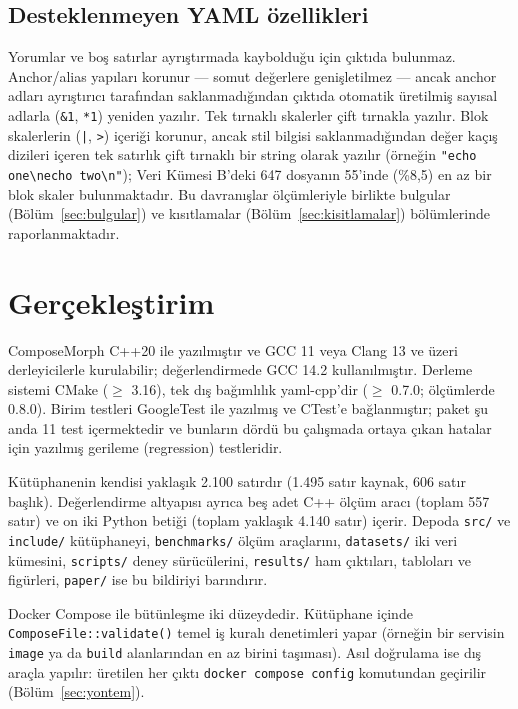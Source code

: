 \documentclass[conference]{IEEEtran}
\begin{document}
\subsection{Desteklenmeyen YAML özellikleri}
Yorumlar ve boş satırlar ayrıştırmada kaybolduğu için çıktıda bulunmaz.
Anchor/alias yapıları korunur --- somut değerlere genişletilmez --- ancak
anchor adları ayrıştırıcı tarafından saklanmadığından çıktıda otomatik
üretilmiş sayısal adlarla (\texttt{\&1}, \texttt{*1}) yeniden yazılır.
Tek tırnaklı skalerler çift tırnakla yazılır. Blok skalerlerin
(\texttt{|}, \texttt{>}) içeriği korunur, ancak stil bilgisi
saklanmadığından değer kaçış dizileri içeren tek satırlık çift tırnaklı bir
string olarak yazılır (örneğin \texttt{"echo one\textbackslash necho two\textbackslash n"});
Veri Kümesi B'deki 647 dosyanın 55'inde (\%8,5) en az bir blok skaler
bulunmaktadır. Bu davranışlar ölçümleriyle birlikte bulgular
(Bölüm~\ref{sec:bulgular}) ve kısıtlamalar (Bölüm~\ref{sec:kisitlamalar})
bölümlerinde raporlanmaktadır.

\section{Gerçekleştirim}
\label{sec:gerceklestirim}

ComposeMorph C++20 ile yazılmıştır ve GCC 11 veya Clang 13 ve üzeri
derleyicilerle kurulabilir; değerlendirmede GCC 14.2 kullanılmıştır.
Derleme sistemi CMake (\(\geq\) 3.16), tek dış bağımlılık
yaml-cpp'dir (\(\geq\) 0.7.0; ölçümlerde 0.8.0). Birim testleri
GoogleTest ile yazılmış ve CTest'e bağlanmıştır; paket şu anda 11 test
içermektedir ve bunların dördü bu çalışmada ortaya çıkan hatalar için
yazılmış gerileme (regression) testleridir.

Kütüphanenin kendisi yaklaşık 2.100 satırdır (1.495 satır kaynak, 606
satır başlık). Değerlendirme altyapısı ayrıca beş adet C++ ölçüm aracı
(toplam 557 satır) ve on iki Python betiği (toplam yaklaşık 4.140 satır)
içerir. Depoda \texttt{src/} ve
\texttt{include/} kütüphaneyi, \texttt{benchmarks/} ölçüm araçlarını,
\texttt{datasets/} iki veri kümesini, \texttt{scripts/} deney
sürücülerini, \texttt{results/} ham çıktıları, tabloları ve figürleri,
\texttt{paper/} ise bu bildiriyi barındırır.

Docker Compose ile bütünleşme iki düzeydedir. Kütüphane içinde
\texttt{ComposeFile::validate()} temel iş kuralı denetimleri yapar
(örneğin bir servisin \texttt{image} ya da \texttt{build} alanlarından en
az birini taşıması). Asıl doğrulama ise dış araçla yapılır: üretilen her
çıktı \texttt{docker compose config} komutundan geçirilir
(Bölüm~\ref{sec:yontem}).
\end{document}
